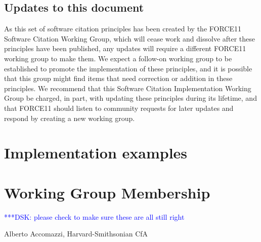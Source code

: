 \documentclass[11pt, oneside]{amsart}
\newcommand{\katznote}[1]{ {\textcolor{blue} { ***DSK: #1 }}} %
\newcommand{\dmnote}[1]{ {\textcolor{purple} { ***DM: #1 }}} %
\newcommand{\LJHnote}[1]{ {\textcolor{fuschsia} { ***LJH: #1 }}} %
\begin{document}

%

\subsection{Updates to this document}

As this set of software citation principles has been created by the FORCE11 Software Citation Working Group, which will cease work and dissolve after these principles have been published,
any updates will require a different FORCE11 working group to make them.
We expect a follow-on working group to be established to promote the implementation of
these principles, and it is possible that this group might find items that need correction or addition
in these principles.
We recommend that this Software Citation Implementation Working Group be charged, in part,
with updating these principles during its lifetime, and that FORCE11 should listen to community requests for later updates and respond by creating a new working group.


\section{Implementation examples}
\label{sec:examples}




\appendix

\section{Working Group Membership}
\label{app:wg_members}

\katznote{please check to make sure these are all still right}

Alberto Accomazzi, Harvard-Smithsonian CfA
\end{document}
